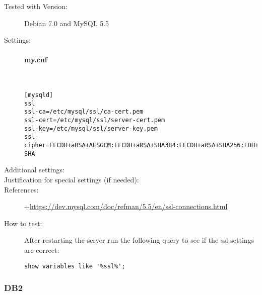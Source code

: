 \begin{description}
\item[Tested with Version:] Debian 7.0 and MySQL 5.5

\item[Settings:] \mbox{}

\paragraph*{my.cnf}\mbox{}\\

\begin{lstlisting}[breaklines]
[mysqld]
ssl
ssl-ca=/etc/mysql/ssl/ca-cert.pem
ssl-cert=/etc/mysql/ssl/server-cert.pem
ssl-key=/etc/mysql/ssl/server-key.pem
ssl-cipher=EECDH+aRSA+AESGCM:EECDH+aRSA+SHA384:EECDH+aRSA+SHA256:EDH+CAMELLIA256:EECDH:EDH+aRSA:+SSLv3:!aNULL:!eNULL:!LOW:!3DES:!MD5:!EXP:!PSK:!SRP:!DSS:!RC4:!SEED:!AES128:!CAMELLIA128:!ECDSA:AES256-SHA
\end{lstlisting}

\item[Additional settings:]


\item[Justification for special settings (if needed):]


\item[References:]
+{\small \url{https://dev.mysql.com/doc/refman/5.5/en/ssl-connections.html}}



\item[How to test:]

After restarting the server run the following query to see if the ssl settings are correct:
\begin{lstlisting}[breaklines]
show variables like '%ssl%';
\end{lstlisting}


\end{description}






\subsubsection{DB2}

